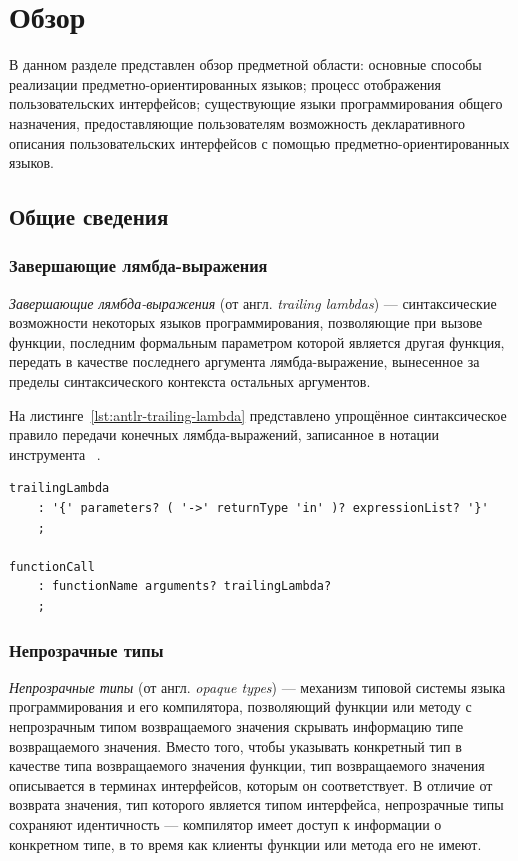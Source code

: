 \section{Обзор}
В данном разделе представлен обзор предметной области:
основные способы реализации предметно-ориентированных языков; 
процесс отображения пользовательских интерфейсов;
существующие языки программирования общего назначения, предоставляющие
пользователям возможность декларативного описания пользовательских
интерфейсов с помощью предметно-ориентированных языков.

\subsection{Общие сведения}
\subsubsection{Завершающие лямбда-выражения}
\label{section:trailing-lambdas}
\textit{Завершающие лямбда-выражения} (от англ. \textit{trailing lambdas})
--- синтаксические возможности некоторых языков программирования,
позволяющие при вызове функции, последним формальным параметром которой
является другая функция, передать в качестве последнего
аргумента лямбда-выражение, вынесенное за пределы синтаксического контекста
остальных аргументов.

На листинге~\ref{lst:antlr-trailing-lambda} представлено упрощённое
синтаксическое правило передачи конечных лямбда-выражений, записанное
в нотации инструмента ~\cite{antlr-homepage}.
\begin{lstlisting}[style=Antlr, caption=Синтаксис завершающих
лямбда-выражений, label={lst:antlr-trailing-lambda}]
trailingLambda
	: '{' parameters? ( '->' returnType 'in' )? expressionList? '}'
	;

functionCall
	: functionName arguments? trailingLambda?
	;
\end{lstlisting}
\subsubsection{Непрозрачные типы}
\label{section:opaque-types}
\textit{Непрозрачные типы} (от англ. \textit{opaque types})
--- механизм типовой системы языка программирования и его компилятора,
позволяющий функции или методу с непрозрачным типом возвращаемого значения
скрывать информацию типе возвращаемого значения. Вместо того, чтобы
указывать конкретный тип в качестве типа возвращаемого значения функции,
тип возвращаемого значения описывается в терминах интерфейсов, которым
он соответствует. В отличие от возврата значения, тип которого является
типом интерфейса, непрозрачные типы сохраняют идентичность ---
компилятор имеет доступ к информации о конкретном типе, в то время как
клиенты функции или метода его не имеют.

